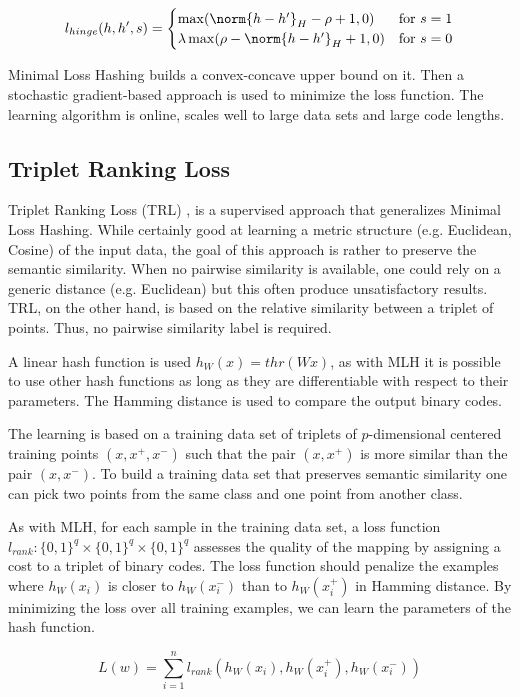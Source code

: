 \[
	l_{hinge}(h, h', s)=
	\begin{cases}
	\max(\norm{h - h'}_{H} - \rho + 1, 0) & \text{for } s=1 \\
	\lambda\max(\rho - \norm{h - h'}_{H} + 1, 0) & \text{for } s=0
	\end{cases}
\]

Minimal Loss Hashing builds a convex-concave upper bound on it. Then a stochastic gradient-based approach is used to minimize the loss function. The learning algorithm is online, scales well to large data sets and large code lengths.

\subsection{Triplet Ranking Loss}
Triplet Ranking Loss (TRL) \cite{norouzi2012hamming},\cite{norouzi2016} is a supervised approach that generalizes Minimal Loss Hashing. While certainly good at learning a metric structure (e.g. Euclidean, Cosine) of the input data, the goal of this approach is rather to preserve the semantic similarity. When no pairwise similarity is available, one could rely on a generic distance (e.g. Euclidean) but this often produce unsatisfactory results. TRL, on the other hand, is based on the relative similarity between a triplet of points. Thus, no pairwise similarity label is required.

A linear hash function is used $h_W(x)=thr(Wx)$, as with MLH it is possible to use other hash functions as long as they are differentiable with respect to their parameters. The Hamming distance is used to compare the output binary codes.

The learning is based on a training data set of triplets of $p$-dimensional centered training points $(x, x^{+}, x^{-})$ such that the pair $(x, x^{+})$ is more similar than the pair $(x, x^{-})$. To build a training data set that preserves semantic similarity one can pick two points from the same class and one point from another class.

As with MLH, for each sample in the training data set, a loss function $l_{rank}: \{0, 1\}^{q}\times\{0, 1\}^{q}\times\{0, 1\}^{q}$ assesses the quality of the mapping by assigning a cost to a triplet of binary codes. The loss function should penalize the examples where $h_W(x_i)$ is closer to $h_W(x^{-}_i)$ than to $h_W(x^{+}_i)$ in Hamming distance. By minimizing the loss over all training examples, we can learn the parameters of the hash function.

\[L(w)=\sum\limits_{i=1}^n l_{rank}(h_W(x_i), h_W(x^{+}_i), h_W(x^{-}_i))\]

